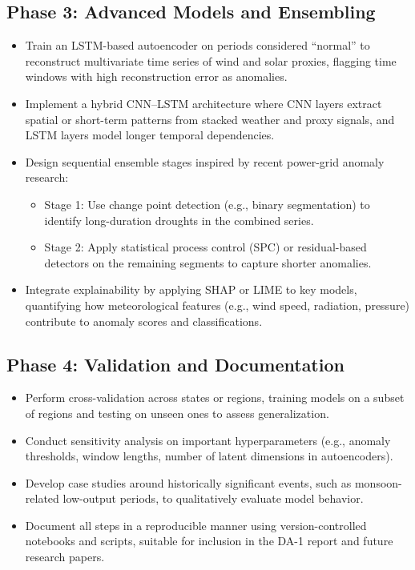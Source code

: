 \documentclass[12pt,a4paper]{article}
\begin{document}
\subsection*{Phase 3: Advanced Models and Ensembling}
\begin{itemize}
    \item Train an LSTM-based autoencoder on periods considered ``normal'' to reconstruct multivariate time series of wind and solar proxies, flagging time windows with high reconstruction error as anomalies.\cite{lead_anomaly}
    \item Implement a hybrid CNN--LSTM architecture where CNN layers extract spatial or short-term patterns from stacked weather and proxy signals, and LSTM layers model longer temporal dependencies.\cite{cnnlstm_solar}
    \item Design sequential ensemble stages inspired by recent power-grid anomaly research:
    \begin{itemize}
        \item Stage 1: Use change point detection (e.g., binary segmentation) to identify long-duration droughts in the combined series.\cite{grid_change_point}
        \item Stage 2: Apply statistical process control (SPC) or residual-based detectors on the remaining segments to capture shorter anomalies.\cite{grid_change_point}
    \end{itemize}
    \item Integrate explainability by applying SHAP or LIME to key models, quantifying how meteorological features (e.g., wind speed, radiation, pressure) contribute to anomaly scores and classifications.\cite{lead_anomaly}
\end{itemize}

\subsection*{Phase 4: Validation and Documentation}
\begin{itemize}
    \item Perform cross-validation across states or regions, training models on a subset of regions and testing on unseen ones to assess generalization.\cite{eu_space_time}
    \item Conduct sensitivity analysis on important hyperparameters (e.g., anomaly thresholds, window lengths, number of latent dimensions in autoencoders).\cite{lead_anomaly}
    \item Develop case studies around historically significant events, such as monsoon-related low-output periods, to qualitatively evaluate model behavior.\cite{mongabay_droughts}
    \item Document all steps in a reproducible manner using version-controlled notebooks and scripts, suitable for inclusion in the DA-1 report and future research papers.\cite{lead_anomaly}
\end{itemize}
\end{document}
